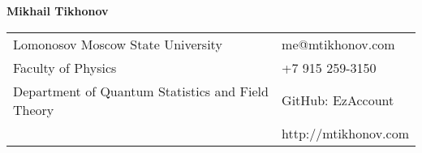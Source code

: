 \documentclass[letterpaper,10pt,oneside,utf8]{article}
\begin{document}
	

	
	\noindent  \LARGE{\textbf{Mikhail Tikhonov}}  \\
	\vspace{-2ex}
	\normalsize
	
	
	
	\begin{center}
		\begin{tabular}{l l}
			Lomonosov Moscow State University   & \hspace{1in} 
			{me@mtikhonov.com} \\
			Faculty of Physics   & \hspace{1in} +7 915 259-3150 \\
			Department of Quantum Statistics and Field Theory         &\hspace{1in} GitHub: EzAccount  \\
			 & \hspace{1in} http://mtikhonov.com \\
		\end{tabular}
	\end{center}
	
	
\end{document}
